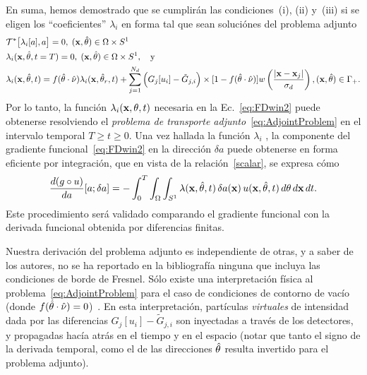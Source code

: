 En suma, hemos 
demostrado que se cumplirán las condiciones~(i), (ii) y~(iii) si se eligen 
los ``coeficientes'' $\lambda_i$ en forma tal que sean soluciónes 
del problema adjunto
\begin{equation}
\begin{split}
\begin{aligned}
  &\mathcal{T}^*\big[\lambda_i[a],a\big]=0, \; (\mathbf{x},\hat{\theta})
  \in \Omega\times S^1\\
  &\lambda_i(\mathbf{x},\hat{\theta},t=T)=0,\; (\mathbf{x},\hat{\theta})
  \in \Omega\times S^1,\quad\mbox{y}\\
  &\lambda_i(\mathbf{x},\hat{\theta},t) = f(\hat{\theta} \cdot \hat{\nu})
  \lambda_i(\mathbf{x},\hat{\theta}_r,t)+\sum_{j=1}^{N_d} \Big( G_j[u_i] 
  -\tilde {G}_{j,i} \Big) \times [1-f(\hat{\theta} \cdot \hat{\nu})] w\left( \frac{
      |\mathbf{x}-\mathbf{x}_j |}{\sigma_d} \right), (\mathbf{x},\hat{\theta}) \in \Gamma_+.
\end{aligned}
\end{split}
\label{eq:AdjointProblem}
\end{equation}
Por lo tanto, la función $\lambda_i(\mathbf{x},\theta,t)$ necesaria en la 
Ec.~\eqref{eq:FDwin2} puede obtenerse resolviendo el \textit{problema 
de transporte adjunto}~\eqref{eq:AdjointProblem} en el intervalo 
temporal  $T \geq t \geq 0$. Una vez hallada la función $\lambda_i$ , 
la componente del gradiente funcional~\eqref{eq:FDwin2} en la 
dirección $\delta a$ puede obtenerse en forma 
eficiente por integración, que en vista de la relación~\eqref{scalar}, 
se expresa cómo
\begin{equation}\label{gradient_fin}
  \frac{d (g \circ u)}{da}[a;\delta a] =-\int_0^T \int_{\Omega} \int_{S^1} \lambda(\mathbf{x},\hat{\theta},t) \, \delta
  a(\mathbf{x}) \, u(\mathbf{x},\hat{\theta},t) \, d \theta \, d\mathbf{x} \, dt.
\end{equation}
Este procedimiento será validado comparando 
el gradiente funcional con la derivada funcional obtenida por diferencias finitas. 

Nuestra derivación del problema adjunto es independiente de otras, 
y a saber de los autores, no se ha reportado en la bibliografía ninguna que incluya las condiciones de borde de Fresnel.  
Sólo existe una interpretación física al 
problema~\eqref{eq:AdjointProblem} para el caso de condiciones 
de contorno de vacío (donde $f(\hat{\theta} \cdot \hat{\nu})=0$)~\cite{Dorn,Dorn2000}. 
En esta interpretación, partículas \textit{virtuales} 
de intensidad dada por las diferencias $G_j[u_i]-\tilde {G}_{j,i}$ 
son inyectadas a través de los detectores, y propagadas hacía atrás en el tiempo 
y en el espacio (notar que tanto el signo de la derivada temporal, 
como el de las direcciones $\hat{\theta}$ resulta invertido para el problema adjunto).

